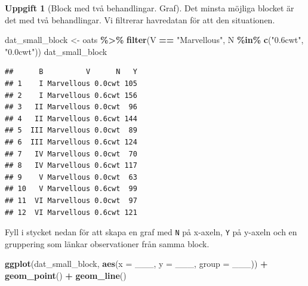 \documentclass[
]{book}
\newenvironment{Shaded}{\begin{snugshade}}{\end{snugshade}}
\newcommand{\AttributeTok}[1]{\textcolor[rgb]{0.13,0.29,0.53}{#1}}
\newcommand{\FunctionTok}[1]{\textcolor[rgb]{0.13,0.29,0.53}{\textbf{#1}}}
\newcommand{\NormalTok}[1]{#1}
\newcommand{\OtherTok}[1]{\textcolor[rgb]{0.56,0.35,0.01}{#1}}
\newcommand{\SpecialCharTok}[1]{\textcolor[rgb]{0.81,0.36,0.00}{\textbf{#1}}}
\newcommand{\StringTok}[1]{\textcolor[rgb]{0.31,0.60,0.02}{#1}}
\theoremstyle{definition}
\theoremstyle{definition}
\theoremstyle{definition}
\newtheorem{exercise}{Uppgift}[chapter]
\theoremstyle{definition}
\theoremstyle{remark}
\begin{document}
\begin{exercise}[Block med två behandlingar. Graf]

Det minsta möjliga blocket är det med två behandlingar. Vi filtrerar havredatan för att den situationen.

\begin{Shaded}
\begin{Highlighting}[]
\NormalTok{dat\_small\_block }\OtherTok{\textless{}{-}}\NormalTok{ oats }\SpecialCharTok{\%\textgreater{}\%} \FunctionTok{filter}\NormalTok{(V }\SpecialCharTok{==} \StringTok{"Marvellous"}\NormalTok{, N }\SpecialCharTok{\%in\%} \FunctionTok{c}\NormalTok{(}\StringTok{"0.6cwt"}\NormalTok{, }\StringTok{"0.0cwt"}\NormalTok{))}
\NormalTok{dat\_small\_block}
\end{Highlighting}
\end{Shaded}

\begin{verbatim}
##      B          V      N   Y
## 1    I Marvellous 0.0cwt 105
## 2    I Marvellous 0.6cwt 156
## 3   II Marvellous 0.0cwt  96
## 4   II Marvellous 0.6cwt 144
## 5  III Marvellous 0.0cwt  89
## 6  III Marvellous 0.6cwt 124
## 7   IV Marvellous 0.0cwt  70
## 8   IV Marvellous 0.6cwt 117
## 9    V Marvellous 0.0cwt  63
## 10   V Marvellous 0.6cwt  99
## 11  VI Marvellous 0.0cwt  97
## 12  VI Marvellous 0.6cwt 121
\end{verbatim}

Fyll i stycket nedan för att skapa en graf med \texttt{N} på x-axeln, \texttt{Y} på y-axeln och en gruppering som länkar observationer från samma block.

\begin{Shaded}
\begin{Highlighting}[]
\FunctionTok{ggplot}\NormalTok{(dat\_small\_block, }\FunctionTok{aes}\NormalTok{(}\AttributeTok{x =}\NormalTok{ \_\_\_, }\AttributeTok{y =}\NormalTok{ \_\_\_, }\AttributeTok{group =}\NormalTok{ \_\_\_)) }\SpecialCharTok{+}
  \FunctionTok{geom\_point}\NormalTok{() }\SpecialCharTok{+}
  \FunctionTok{geom\_line}\NormalTok{()}
\end{Highlighting}
\end{Shaded}

\end{exercise}
\end{document}

